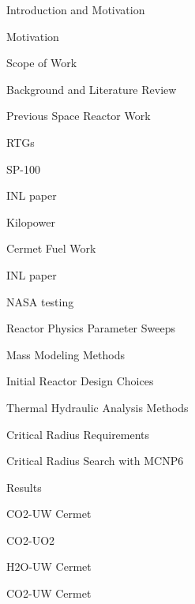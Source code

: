 \documentclass{report}
\begin{document}
\begin{outline}
  \item { Introduction and Motivation }
  \begin{outline}
    \item { Motivation } \\
    \item { Scope of Work } \\
  \end{outline}
  \item { Background and Literature Review }
      \begin{outline}
          \item { Previous Space Reactor Work }
                \begin{outline}
                \item {RTGs}
                \item {SP-100}
                \item {INL paper}
                \item {Kilopower}
                \end{outline}
           \item { Cermet Fuel Work }
                \begin{outline}
                \item {INL paper}
                \item {NASA testing}
                \end{outline}
      \end{outline}
  \item { Reactor Physics Parameter Sweeps }
  \item { Mass Modeling Methods }
      \begin{outline}
      \item { Initial Reactor Design Choices }
      \item { Thermal Hydraulic Analysis Methods }
      \item { Critical Radius Requirements }
          \begin{outline}
          \item { Critical Radius Search with MCNP6}
          \item { Results }
              \begin{outline}
              \item {CO2-UW Cermet}
              \item {CO2-UO2}
              \item {H2O-UW Cermet}
              \item {CO2-UW Cermet}

\end{outline}
\end{outline}
\end{outline}
\end{outline}
\end{document}

